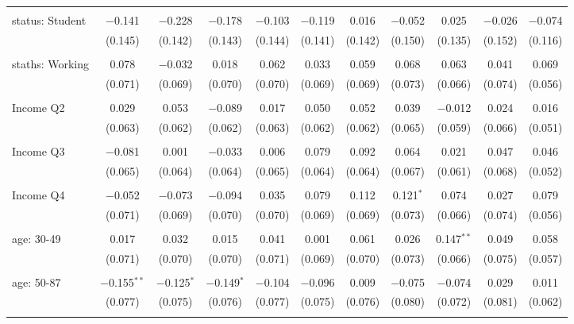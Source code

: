 \begin{tabular}{@{\extracolsep{5pt}}lcccccccccc}
  & & & & & & & & & & \\ 
 status: Student & $-$0.141 & $-$0.228 & $-$0.178 & $-$0.103 & $-$0.119 & 0.016 & $-$0.052 & 0.025 & $-$0.026 & $-$0.074 \\ 
  & (0.145) & (0.142) & (0.143) & (0.144) & (0.141) & (0.142) & (0.150) & (0.135) & (0.152) & (0.116) \\ 
  & & & & & & & & & & \\ 
 staths: Working & 0.078 & $-$0.032 & 0.018 & 0.062 & 0.033 & 0.059 & 0.068 & 0.063 & 0.041 & 0.069 \\ 
  & (0.071) & (0.069) & (0.070) & (0.070) & (0.069) & (0.069) & (0.073) & (0.066) & (0.074) & (0.056) \\ 
  & & & & & & & & & & \\ 
 Income Q2 & 0.029 & 0.053 & $-$0.089 & 0.017 & 0.050 & 0.052 & 0.039 & $-$0.012 & 0.024 & 0.016 \\ 
  & (0.063) & (0.062) & (0.062) & (0.063) & (0.062) & (0.062) & (0.065) & (0.059) & (0.066) & (0.051) \\ 
  & & & & & & & & & & \\ 
 Income Q3 & $-$0.081 & 0.001 & $-$0.033 & 0.006 & 0.079 & 0.092 & 0.064 & 0.021 & 0.047 & 0.046 \\ 
  & (0.065) & (0.064) & (0.064) & (0.065) & (0.064) & (0.064) & (0.067) & (0.061) & (0.068) & (0.052) \\ 
  & & & & & & & & & & \\ 
 Income Q4 & $-$0.052 & $-$0.073 & $-$0.094 & 0.035 & 0.079 & 0.112 & 0.121$^{*}$ & 0.074 & 0.027 & 0.079 \\ 
  & (0.071) & (0.069) & (0.070) & (0.070) & (0.069) & (0.069) & (0.073) & (0.066) & (0.074) & (0.056) \\ 
  & & & & & & & & & & \\ 
 age: 30-49 & 0.017 & 0.032 & 0.015 & 0.041 & 0.001 & 0.061 & 0.026 & 0.147$^{**}$ & 0.049 & 0.058 \\ 
  & (0.071) & (0.070) & (0.070) & (0.071) & (0.069) & (0.070) & (0.073) & (0.066) & (0.075) & (0.057) \\ 
  & & & & & & & & & & \\ 
 age: 50-87 & $-$0.155$^{**}$ & $-$0.125$^{*}$ & $-$0.149$^{*}$ & $-$0.104 & $-$0.096 & 0.009 & $-$0.075 & $-$0.074 & 0.029 & 0.011 \\ 
  & (0.077) & (0.075) & (0.076) & (0.077) & (0.075) & (0.076) & (0.080) & (0.072) & (0.081) & (0.062) \\ 
  & & & & & & & & & & \\ 

\end{tabular}

